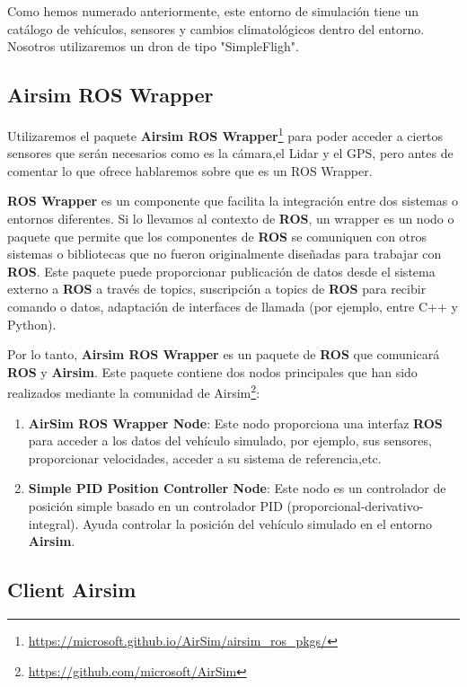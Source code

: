 Como hemos numerado anteriormente, este entorno de simulación tiene un catálogo de vehículos, sensores y
cambios climatológicos dentro del entorno. Nosotros utilizaremos un dron de tipo "SimpleFligh". 

\subsection{Airsim ROS Wrapper}
\label{sec:wrapper}
Utilizaremos el paquete \textbf{Airsim ROS Wrapper}\footnote{\url{https://microsoft.github.io/AirSim/airsim_ros_pkgs/}} para poder acceder a ciertos sensores 
que serán necesarios como es la cámara,el Lidar y el GPS, pero antes de comentar lo que ofrece hablaremos sobre que es un ROS Wrapper. \newline

\textbf{ROS Wrapper} es un componente que facilita la integración entre dos sistemas o entornos diferentes. Si lo llevamos al contexto de \textbf{ROS}, un wrapper es un nodo o paquete 
que permite que los componentes de \textbf{ROS} se comuniquen con otros sistemas o bibliotecas que no fueron originalmente diseñadas para trabajar con \textbf{ROS}. Este paquete 
puede proporcionar publicación de datos desde el sistema externo a \textbf{ROS} a través de topics, suscripción a topics de \textbf{ROS} para recibir comando o datos, adaptación 
de interfaces de llamada (por ejemplo, entre C++ y Python). \newline

Por lo tanto, \textbf{Airsim ROS Wrapper} es un paquete de \textbf{ROS} que comunicará \textbf{ROS} y \textbf{Airsim}. Este paquete contiene dos nodos principales 
que han sido realizados mediante la comunidad de Airsim\footnote{\url{https://github.com/microsoft/AirSim}}:
\begin{enumerate}
  \item \textbf{AirSim ROS Wrapper Node}: Este nodo proporciona una interfaz \textbf{ROS} para acceder a los datos del vehículo simulado, por ejemplo, sus sensores, proporcionar velocidades, acceder a su sistema de referencia,etc. 
  \item \textbf{Simple PID Position Controller Node}: Este nodo es un controlador de posición simple basado en un controlador PID (proporcional-derivativo-integral). Ayuda controlar la posición del vehículo 
  simulado en el entorno \textbf{Airsim}.
\end{enumerate}

\subsection{Client Airsim}
\label{sec:Client Airsim}

